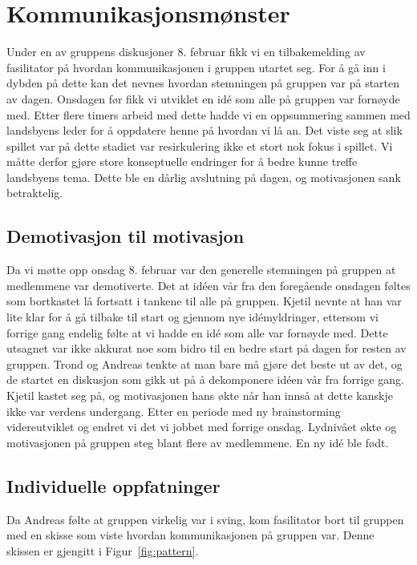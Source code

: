 
\section{Kommunikasjonsmønster} %
Under en av gruppens diskusjoner 8. februar fikk vi en tilbakemelding av
fasilitator på hvordan kommunikasjonen i gruppen utartet seg. For å gå
inn i dybden på dette kan det nevnes hvordan stemningen på gruppen var
på starten av dagen. Onsdagen før fikk vi utviklet en idé som alle på
gruppen var fornøyde med. Etter flere timers arbeid med dette hadde vi
en oppsummering sammen med landsbyens leder for å oppdatere henne på
hvordan vi lå an. Det viste seg at slik spillet var på dette stadiet var
resirkulering ikke et stort nok fokus i spillet. Vi måtte derfor gjøre
store konseptuelle endringer for å bedre kunne treffe landsbyens tema.
Dette ble en dårlig avslutning på dagen, og motivasjonen sank
betraktelig.

\subsection{Demotivasjon til motivasjon}
Da vi møtte opp onsdag 8. februar var den generelle stemningen på
gruppen at medlemmene var demotiverte. Det at idéen vår fra den
foregående onsdagen føltes som bortkastet lå fortsatt i tankene til alle
på gruppen. Kjetil nevnte at han var lite klar for å gå tilbake til
start og gjennom nye idémyldringer, ettersom vi forrige gang endelig
følte at vi hadde en idé som alle var fornøyde med. Dette utsagnet var
ikke akkurat noe som bidro til en bedre start på dagen for resten av
gruppen. Trond og Andreas tenkte at man bare må gjøre det beste ut av
det, og de startet en diskusjon som gikk ut på å dekomponere idéen vår
fra forrige gang. Kjetil kastet seg på, og motivasjonen hans økte når
han innså at dette kanskje ikke var verdens undergang. Etter en periode
med ny brainstorming videreutviklet og endret vi det vi jobbet med
forrige onsdag. Lydnivået økte og motivasjonen på gruppen steg blant
flere av medlemmene. En ny idé ble født.

\subsection{Individuelle oppfatninger}
Da Andreas følte at gruppen virkelig var i sving, kom fasilitator bort
til gruppen med en skisse som viste hvordan kommunikasjonen på gruppen
var. Denne skissen er gjengitt i Figur~\ref{fig:pattern}.

